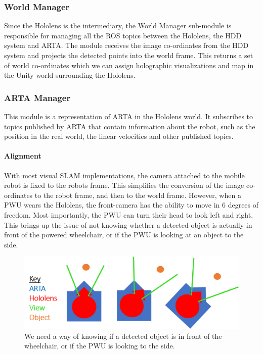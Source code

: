 \subsubsection{World Manager}
Since the Hololens is the intermediary, the World Manager sub-module is responsible for managing all the ROS topics between the Hololens, the HDD system and ARTA. The module receives the image co-ordinates from the HDD system and projects the detected points into the world frame. This returns a set of world co-ordinates which we can assign holographic visualizations and map in the Unity world surrounding the Hololens.

\subsubsection{ARTA Manager} 
This module is a representation of ARTA in the Hololens world. It subscribes to topics published by ARTA that contain information about the robot, such as the position in the real world, the linear velocities and other published topics. 

\paragraph{Alignment}With most visual SLAM implementations, the camera attached to the mobile robot is fixed to the robots frame. This simplifies the conversion of the image co-ordinates to the robot frame, and then to the world frame. However, when a PWU wears the Hololens, the front-camera has the ability to move in 6 degrees of freedom. Most importantly, the PWU can turn their head to look left and right. This brings up the issue of not knowing whether a detected object is actually in front of the powered wheelchair, or if the PWU is looking at an object to the side. 

\begin{figure}[ht!]
	\centering
	\includegraphics[width=0.9\linewidth]{img/chapter4_analysis/holoArtaAligned.png}
	\caption{We need a way of knowing if a detected object is in front of the wheelchair, or if the PWU is looking to the side. }
	\label{fig:holoArtaAlignment}
\end{figure}

